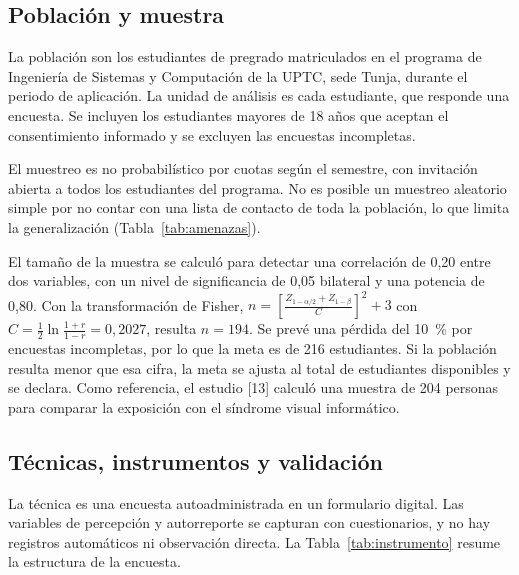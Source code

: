\subsection{Población y muestra}

La población son los estudiantes de pregrado matriculados en el programa de Ingeniería de
Sistemas y Computación de la UPTC, sede Tunja, durante el periodo de aplicación. La
unidad de análisis es cada estudiante, que responde una encuesta. Se incluyen los
estudiantes mayores de 18 años que aceptan el consentimiento informado y se excluyen las
encuestas incompletas.


El muestreo es no probabilístico por cuotas según el semestre, con invitación abierta a
todos los estudiantes del programa. No es posible un muestreo aleatorio simple por no
contar con una lista de contacto de toda la población, lo que limita la generalización
(Tabla~\ref{tab:amenazas}).

El tamaño de la muestra se calculó para detectar una correlación de 0,20 entre dos
variables, con un nivel de significancia de 0,05 bilateral y una potencia de 0,80. Con la
transformación de Fisher, $n=\left[\frac{Z_{1-\alpha/2}+Z_{1-\beta}}{C}\right]^{2}+3$ con
$C=\frac{1}{2}\ln\frac{1+r}{1-r}=0{,}2027$, resulta $n=194$. Se prevé una pérdida del 10~\%
por encuestas incompletas, por lo que la meta es de 216 estudiantes. Si la población
resulta menor que esa cifra, la meta se ajusta al total de estudiantes disponibles y se
declara. Como referencia, el estudio [13] calculó una muestra de 204 personas para
comparar la exposición con el síndrome visual informático.

\subsection{Técnicas, instrumentos y validación}

La técnica es una encuesta autoadministrada en un formulario digital. Las variables de
percepción y autorreporte se capturan con cuestionarios, y no hay registros automáticos ni
observación directa. La Tabla~\ref{tab:instrumento} resume la estructura de la encuesta.

